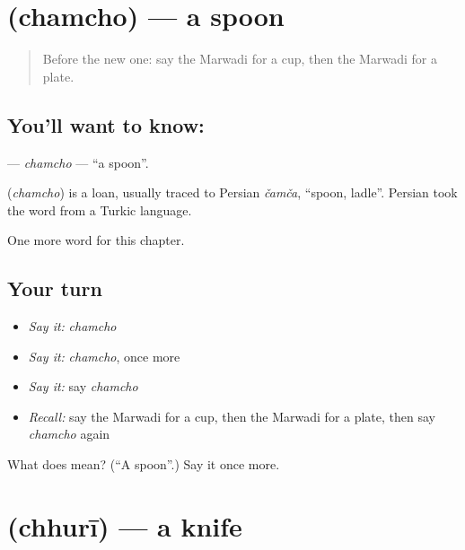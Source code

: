 \section[\texorpdfstring{\mw{चमचो} (chamcho)}{चमचो (chamcho)}]{ (chamcho) — a spoon}

\label{lesson:MW-C64-chamcho}



\begin{quote}
Before the new one: say the Marwadi for a cup, then the Marwadi for a plate.
\end{quote}

\subsection*{You'll want to know: }
\textbf{} — \emph{chamcho} — \textquotedblleft{}a spoon\textquotedblright{}.

\begin{cousinweb}
\textbf{} (\emph{chamcho}) is a loan, usually traced to Persian \emph{čamča}, \textquotedblleft{}spoon, ladle\textquotedblright{}. Persian took the word from a Turkic language.
\end{cousinweb}

\begin{grammarlens}[title={What you've built}]
One more word for this chapter.
\end{grammarlens}

\subsection*{Your turn}
\begin{itemize}
\raggedright
  \item \emph{Say it:} \emph{chamcho}
  \item \emph{Say it:} \emph{chamcho}, once more
  \item \emph{Say it:} say \emph{chamcho}
  \item \emph{Recall:} say the Marwadi for a cup, then the Marwadi for a plate, then say \emph{chamcho} again
\end{itemize}

\begin{tcolorbox}[breakable,colback=teal!4,colframe=teal!35!black,title={Before you move on}]
What does  mean? (\textquotedblleft{}A spoon\textquotedblright{}.) Say it once more.
\end{tcolorbox}
\section[\texorpdfstring{\mw{छुरी} (chhurī)}{छुरी (chhurī)}]{ (chhurī) — a knife}

